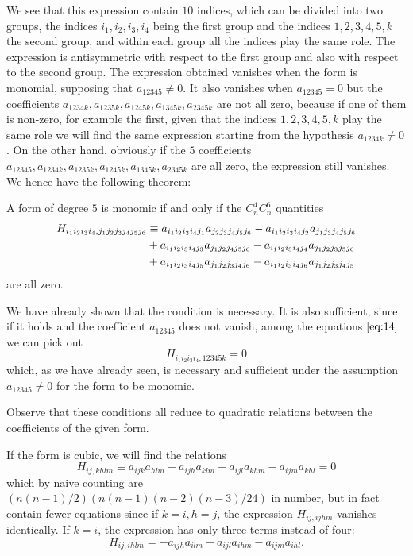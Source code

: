 We see that this expression contain $10$ indices, which can be divided into two groups, the indices $i_{1},i_{2},i_{3},i_{4}$ being the first group and the indices $1,2,3,4,5,k$ the second group, and within each group all the indices play the same role. The expression is antisymmetric with respect to the first group and also  with respect to the second group. The expression obtained vanishes when the form is monomial, supposing that $a_{12345}\neq 0$. It also vanishes when $a_{12345}=0$ but the coefficients $a_{1234k}, a_{1235k},a_{1245k},a_{1345k},a_{2345k}$ are not all zero, because if one of them is non-zero, for example the first, given that the indices $1,2,3,4,5,k$ play the same role we will find the same expression starting from the hypothesis $a_{1234k}\neq0$. On the other hand, obviously  if the $5$ coefficients $a_{12345},a_{1234k},a_{1235k},a_{1245k},a_{1345k},a_{2345k}$ are all zero, the expression still vanishes. We hence have the following theorem:
\begin{thm*}
  A form of degree $5$ is monomic if and only if the $C^{4}_{n}C^{6}_{n}$ quantities
  \begin{align}
    \label{eq:14}
    H_{i_{1}i_{2}i_{3}i_{4},j_{1}j_{2}j_{3}j_{4}j_{5}j_{6}}&\equiv
a_{i_{1}i_{2}i_{3}i_{4}j_{1}}a_{j_{2}j_{3}j_{4}j_{5}j_{6}}
-a_{i_{1}i_{2}i_{3}i_{4}j_{2}}a_{j_{1}j_{3}j_{4}j_{5}j_{6}}\\
&+a_{i_{1}i_{2}i_{3}i_{4}j_{3}}a_{j_{1}j_{2}j_{4}j_{5}j_{6}}
-a_{i_{1}i_{2}i_{3}i_{4}j_{4}}a_{j_{1}j_{2}j_{3}j_{5}j_{6}}\notag\\
&+a_{i_{1}i_{2}i_{3}i_{4}j_{5}}a_{j_{1}j_{2}j_{3}j_{4}j_{6}}
-a_{i_{1}i_{2}i_{3}i_{4}j_{6}}a_{j_{1}j_{2}j_{3}j_{4}j_{5}}\notag
  \end{align}
are all zero.
\end{thm*}

We have already shown that the condition is necessary. It is also sufficient, since if it holds and the coefficient $a_{12345}$ does not vanish, among the equations $\eqref{eq:14}$ we can pick out 
\[
H_{i_{1}i_{2}i_{3}i_{4},12345k}=0
\]
which, as we have already seen, is necessary and sufficient under the assumption $a_{12345}\neq 0$ for the form to be monomic.

Observe that these conditions all reduce to quadratic relations between the coefficients of the given form.

If the form is cubic, we will find the relations
\[
H_{ij,khlm}\equiv a_{ijk}a_{hlm}-a_{ijh}a_{klm}+a_{ijl}a_{khm}-a_{ijm}a_{khl}=0
\]
which by naive counting are $(n(n-1)/2)(n(n-1)(n-2)(n-3)/24)$ in number, but in fact contain fewer equations since if $k=i,h=j$, the expression $H_{ij,ijhm}$ vanishes identically. If $k=i$, the expression has only three terms instead of four:
\[
H_{ij,ihlm}=-a_{ijh}a_{ilm}+a_{ijl}a_{ihm}-a_{ijm}a_{ihl}.
\]

